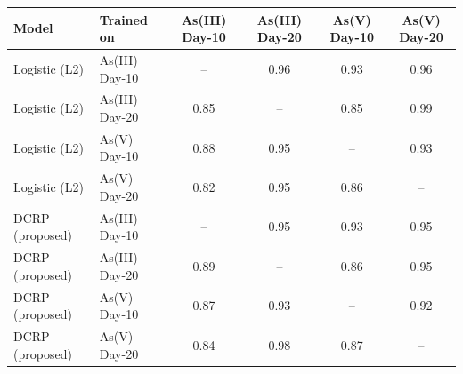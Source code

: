\begin{tabular}{llcccc}
  \toprule
  Model & Trained on & As(III) Day-10 & As(III) Day-20 & As(V) Day-10 & As(V) Day-20 \\
  \midrule
  Logistic (L2) & As(III) Day-10 & -- & 0.96 & 0.93 & 0.96 \\
  Logistic (L2) & As(III) Day-20 & 0.85 & -- & 0.85 & 0.99 \\
  Logistic (L2) & As(V) Day-10 & 0.88 & 0.95 & -- & 0.93 \\
  Logistic (L2) & As(V) Day-20 & 0.82 & 0.95 & 0.86 & -- \\
  DCRP (proposed) & As(III) Day-10 & -- & 0.95 & 0.93 & 0.95 \\
  DCRP (proposed) & As(III) Day-20 & 0.89 & -- & 0.86 & 0.95 \\
  DCRP (proposed) & As(V) Day-10 & 0.87 & 0.93 & -- & 0.92 \\
  DCRP (proposed) & As(V) Day-20 & 0.84 & 0.98 & 0.87 & -- \\
  \bottomrule
\end{tabular}
